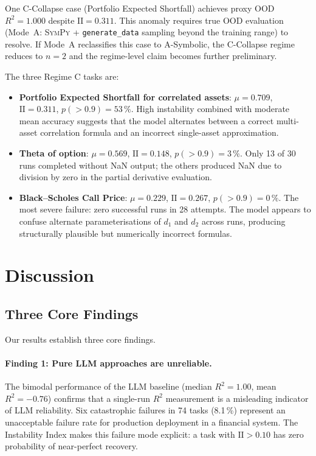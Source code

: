 \documentclass[twoside,11pt]{article}
\newcommand{\Rsq}{R^{2}}
\newcommand{\II}{\mathrm{II}}
\begin{document}
One C-Collapse case (Portfolio Expected Shortfall) achieves proxy OOD $\Rsq=1.000$
despite $\II=0.311$.  This anomaly requires true OOD evaluation (Mode~A:
\textsc{SymPy} + \texttt{generate\_data} sampling beyond the training range) to
resolve.  If Mode~A reclassifies this case to A-Symbolic, the C-Collapse regime
reduces to $n=2$ and the regime-level claim becomes further preliminary.

The three Regime C tasks are:
\begin{itemize}
  \item \textbf{Portfolio Expected Shortfall for correlated assets}:
    $\mu=0.709$, $\II=0.311$, $p(>0.9)=53\,\%$.  High instability combined with
    moderate mean accuracy suggests that the model alternates between a correct
    multi-asset correlation formula and an incorrect single-asset approximation.
  \item \textbf{Theta of option}: $\mu=0.569$, $\II=0.148$, $p(>0.9)=3\,\%$.
    Only 13 of 30 runs completed without NaN output; the others produced NaN due
    to division by zero in the partial derivative evaluation.
  \item \textbf{Black--Scholes Call Price}: $\mu=0.229$, $\II=0.267$, $p(>0.9)=0\,\%$.
    The most severe failure: zero successful runs in 28 attempts.  The model
    appears to confuse alternate parameterisations of $d_1$ and $d_2$ across runs,
    producing structurally plausible but numerically incorrect formulas.
\end{itemize}

\section{Discussion}
\label{sec:discussion}

\subsection{Three Core Findings}\label{subsec:three-core-findings}
\label{sec:disc_findings}

Our results establish three core findings.

\paragraph{Finding 1: Pure LLM approaches are unreliable.}
The bimodal performance of the LLM baseline (median $\Rsq=1.00$, mean $\Rsq=-0.76$)
confirms that a single-run $\Rsq$ measurement is a misleading indicator of LLM
reliability.  Six catastrophic failures in 74 tasks (8.1\,\%) represent an
unacceptable failure rate for production deployment in a financial system.  The
Instability Index makes this failure mode explicit: a task with $\II>0.10$ has
zero probability of near-perfect recovery.
\end{document}
